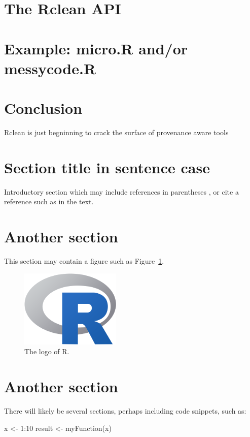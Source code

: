 \section{The Rclean API}


\section{Example: micro.R and/or messycode.R}


\section{Conclusion }

Rclean is just begninning to crack the surface of
  provenance aware tools

\section{Section title in sentence case}

Introductory section which may include references in parentheses
\citep{R}, or cite a reference such as \citet{R} in the text.

\section{Another section}

This section may contain a figure such as Figure~\ref{figure:rlogo}.

\begin{figure}[htbp]
  \centering
  \includegraphics{Rlogo-5}
  \caption{The logo of R.}
  \label{figure:rlogo}
\end{figure}

\section{Another section}

There will likely be several sections, perhaps including code snippets, such as:

\begin{example}
  x <- 1:10
  result <- myFunction(x)
\end{example}

